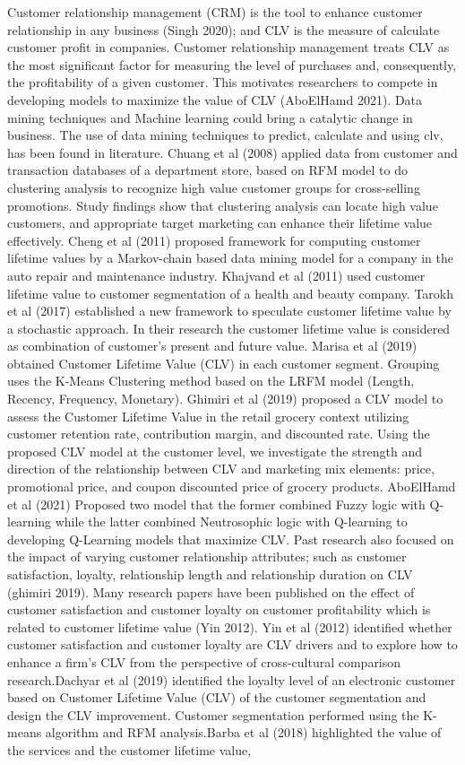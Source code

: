 \documentclass{article}
\begin{document}
\par Customer relationship management (CRM) is the tool to enhance customer relationship in any business (Singh 2020); and CLV is the measure of calculate customer profit in companies. Customer relationship management treats CLV as the most significant factor for measuring the level of purchases and, consequently, the profitability of a given customer. This motivates researchers to compete in developing models to maximize the value of CLV (AboElHamd 2021). Data mining techniques and Machine learning could bring a catalytic change in business. The use of data mining techniques to predict, calculate and using clv, has been found in literature. Chuang et al (2008) applied data from customer and transaction databases of a department store, based on RFM model to do clustering analysis to recognize high value customer groups for cross-selling promotions. Study findings show that clustering analysis can locate high value customers, and appropriate target marketing can enhance their lifetime value effectively. Cheng et al (2011) proposed framework for computing customer lifetime values by a Markov-chain based data mining model for a company in the auto repair and maintenance industry. Khajvand et al (2011) used customer lifetime value to customer segmentation of a health and beauty company. Tarokh et al (2017) established a new framework to speculate customer lifetime value by a stochastic approach. In their research the customer lifetime value is considered as combination of customer’s present and future value. Marisa et al (2019) obtained Customer Lifetime Value (CLV) in each customer segment. Grouping uses the K-Means Clustering method based on the LRFM model (Length, Recency, Frequency, Monetary). Ghimiri et al (2019) proposed a CLV model to assess the Customer Lifetime Value in the retail grocery context utilizing customer retention rate, contribution margin, and discounted rate. Using the proposed CLV model at the customer level, we investigate the strength and direction of the relationship between CLV and marketing mix elements: price, promotional price, and coupon discounted price of grocery products.  AboElHamd et al (2021) Proposed two model that the former combined Fuzzy logic with Q-learning while the latter combined Neutrosophic logic with Q-learning to developing Q-Learning models that maximize CLV. Past research also focused on the impact of varying customer relationship attributes; such as customer satisfaction, loyalty, relationship length and relationship duration on CLV (ghimiri 2019). Many research papers have been published on the effect of customer satisfaction and customer loyalty on customer profitability which is related to customer lifetime value (Yin 2012). Yin et al (2012) identified whether customer satisfaction and customer loyalty are CLV drivers and to explore how to enhance a firm’s CLV from the perspective of cross-cultural comparison research.Dachyar et al (2019) identified the loyalty level of an electronic customer based on Customer Lifetime Value (CLV) of the customer segmentation and design the CLV improvement. Customer segmentation performed using the K-means algorithm and RFM analysis.Barba et al (2018) highlighted the value of the services and the customer lifetime value, 
\end{document}
